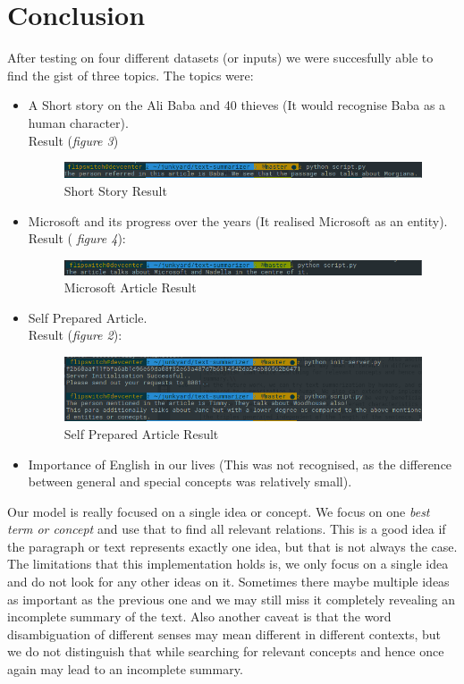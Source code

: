 \documentclass[conference]{IEEEtran}
\begin{document}
\section{Conclusion}
After testing on four different datasets (or inputs) we were succesfully able to find the gist of three topics. The topics were:
\begin{itemize}
\item A Short story on the Ali Baba and 40 thieves (It would recognise Baba as a human character).\\Result (\textit{figure 3})\\
\begin{figure}[h!]
\centering
\includegraphics[scale=0.3]{image3}
\caption{Short Story Result}
    \label{fig:image3}
\end{figure}
\item Microsoft and its progress over the years (It realised Microsoft as an entity).\\Result ( \textit{figure 4}):
\begin{figure}[h!]
\centering
\includegraphics[scale=0.3]{image4}
\caption{Microsoft Article Result}
    \label{fig:image4}
\end{figure}
\item Self Prepared Article.\\Result (\textit{figure 2}):\\
\begin{figure}[h!]
\centering
\includegraphics[scale=0.3]{image2}
\caption{Self Prepared Article Result}
    \label{fig:image2}
\end{figure}
\item Importance of English in our lives (This was not recognised, as the difference between general and special concepts was relatively small).
\end{itemize}
Our model is really focused on a single idea or concept. We focus on one \textit{best term or concept} and use that to find all relevant relations. This is a good idea if the paragraph or text represents exactly one idea, but that is not always the case. The limitations that this implementation holds is, we only focus on a single idea and do not look for any other ideas on it. Sometimes there maybe multiple ideas as important as the previous one and we may still miss it completely revealing an incomplete summary of the text. Also another caveat is that the word disambiguation of different senses may mean different in different contexts, but we do not distinguish that while searching for relevant concepts and hence once again may lead to an incomplete summary.\\
\end{document}
